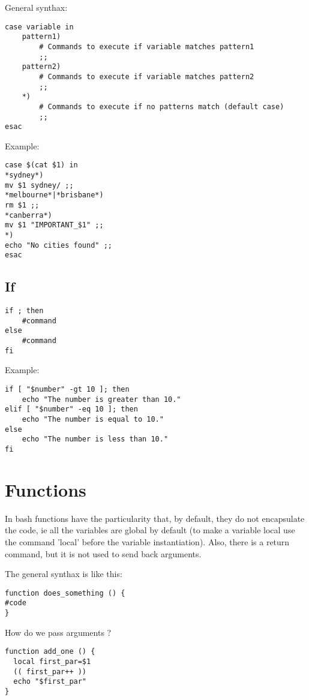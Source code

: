 \documentclass[24pt]{article}
\begin{document}
General synthax:
\begin{lstlisting}
case variable in
    pattern1)
        # Commands to execute if variable matches pattern1
        ;;
    pattern2)
        # Commands to execute if variable matches pattern2
        ;;
    *)
        # Commands to execute if no patterns match (default case)
        ;;
esac
\end{lstlisting}

Example:

\begin{lstlisting}
case $(cat $1) in
*sydney*)
mv $1 sydney/ ;;
*melbourne*|*brisbane*)
rm $1 ;;
*canberra*)
mv $1 "IMPORTANT_$1" ;;
*)
echo "No cities found" ;;
esac
\end{lstlisting}

\subsection{If}
\begin{lstlisting}
if ; then 
    #command
else
    #command
fi        
\end{lstlisting}

Example:
\begin{lstlisting}
if [ "$number" -gt 10 ]; then
    echo "The number is greater than 10."
elif [ "$number" -eq 10 ]; then
    echo "The number is equal to 10."
else
    echo "The number is less than 10."
fi       
\end{lstlisting}



\section{Functions}

In bash functions have the particularity that, by default, they do not encapsulate the code, ie all the variables are global by default (to make a variable local use the command 'local' before the variable instantiation). Also, there is a return command, but it is not used to send back arguments.


The general synthax is like this:

\begin{lstlisting}
function does_something () {
#code
}
\end{lstlisting}

How do we pass arguments ? 

\begin{lstlisting}
function add_one () {
  local first_par=$1
  (( first_par++ ))
  echo "$first_par"
}
\end{lstlisting}
\end{document}
